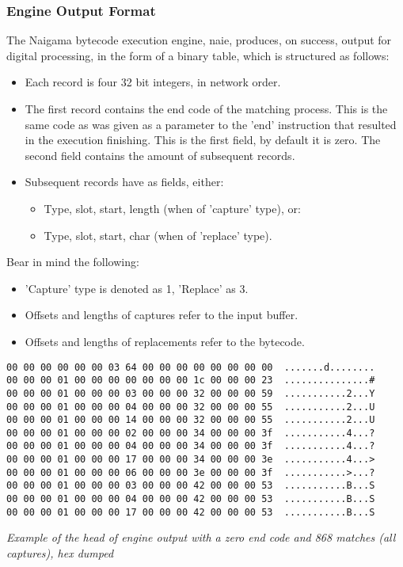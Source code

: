 \subsubsection{Engine Output Format}

The Naigama bytecode execution engine, naie, produces, on success, output for
digital processing, in the form of a binary table, which is structured
as follows:

\begin{itemize}

\item Each record is four 32 bit integers, in network order.

\item The first record contains the end code of the matching process.
This is the same code as was given as a parameter to the 'end'
instruction that resulted in the execution finishing. This is the
first field, by default it is zero.
The second field contains the amount of subsequent records.

\item Subsequent records have as fields, either:

\begin{itemize}
\item Type, slot, start, length (when of 'capture' type), or:
\item Type, slot, start, char (when of 'replace' type).
\end{itemize}

\end{itemize}

Bear in mind the following:

\begin{itemize}
\item 'Capture' type is denoted as 1, 'Replace' as 3.
\item Offsets and lengths of captures refer to the input buffer.
\item Offsets and lengths of replacements refer to the bytecode.
\end{itemize}

\begin{myquote}
\begin{verbatim}
00 00 00 00 00 00 03 64 00 00 00 00 00 00 00 00  .......d........
00 00 00 01 00 00 00 00 00 00 00 1c 00 00 00 23  ...............#
00 00 00 01 00 00 00 03 00 00 00 32 00 00 00 59  ...........2...Y
00 00 00 01 00 00 00 04 00 00 00 32 00 00 00 55  ...........2...U
00 00 00 01 00 00 00 14 00 00 00 32 00 00 00 55  ...........2...U
00 00 00 01 00 00 00 02 00 00 00 34 00 00 00 3f  ...........4...?
00 00 00 01 00 00 00 04 00 00 00 34 00 00 00 3f  ...........4...?
00 00 00 01 00 00 00 17 00 00 00 34 00 00 00 3e  ...........4...>
00 00 00 01 00 00 00 06 00 00 00 3e 00 00 00 3f  ...........>...?
00 00 00 01 00 00 00 03 00 00 00 42 00 00 00 53  ...........B...S
00 00 00 01 00 00 00 04 00 00 00 42 00 00 00 53  ...........B...S
00 00 00 01 00 00 00 17 00 00 00 42 00 00 00 53  ...........B...S
\end{verbatim}
\end{myquote}
\textit{Example of the head of engine output with a zero end code
and 868 matches (all captures), hex dumped}
